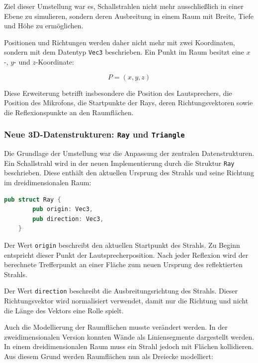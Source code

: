 \documentclass{article}
\begin{document}
    Ziel dieser Umstellung war es, Schallstrahlen nicht mehr ausschließlich in
    einer Ebene zu simulieren, sondern deren Ausbreitung in einem Raum mit Breite,
    Tiefe und Höhe zu ermöglichen.

    Positionen und Richtungen werden daher nicht mehr mit zwei Koordinaten,
    sondern mit dem Datentyp \texttt{Vec3} beschrieben. Ein Punkt im Raum besitzt
    eine \(x\)-, \(y\)- und \(z\)-Koordinate:

    \[
    P = (x,y,z)
    \]

    Diese Erweiterung betrifft insbesondere die Position des Lautsprechers, die
    Position des Mikrofons, die Startpunkte der Rays, deren Richtungsvektoren
    sowie die Reflexionspunkte an den Raumflächen.


    \subsubsection{Neue 3D-Datenstrukturen: \texttt{Ray} und \texttt{Triangle}}
    \label{subsubsec:ray-triangle}

    Die Grundlage der Umstellung war die Anpassung der zentralen Datenstrukturen.
    Ein Schallstrahl wird in der neuen Implementierung durch die Struktur
    \texttt{Ray} beschrieben. Diese enthält den aktuellen Ursprung des Strahls und
    seine Richtung im dreidimensionalen Raum:

    \begin{lstlisting}[language=Rust]
    pub struct Ray {
        pub origin: Vec3,
        pub direction: Vec3,
    }
    \end{lstlisting}

    Der Wert \texttt{origin} beschreibt den aktuellen Startpunkt des Strahls.
    Zu Beginn entspricht dieser Punkt der Lautsprecherposition. Nach jeder
    Reflexion wird der berechnete Trefferpunkt an einer Fläche zum neuen Ursprung
    des reflektierten Strahls.

    Der Wert \texttt{direction} beschreibt die Ausbreitungsrichtung des Strahls.
    Dieser Richtungsvektor wird normalisiert verwendet, damit nur die Richtung und
    nicht die Länge des Vektors eine Rolle spielt.

    Auch die Modellierung der Raumflächen musste verändert werden. In der
    zweidimensionalen Version konnten Wände als Liniensegmente dargestellt werden.
    In einem dreidimensionalen Raum muss ein Strahl jedoch mit Flächen kollidieren.
    Aus diesem Grund werden Raumflächen nun als Dreiecke modelliert:
\end{document}
